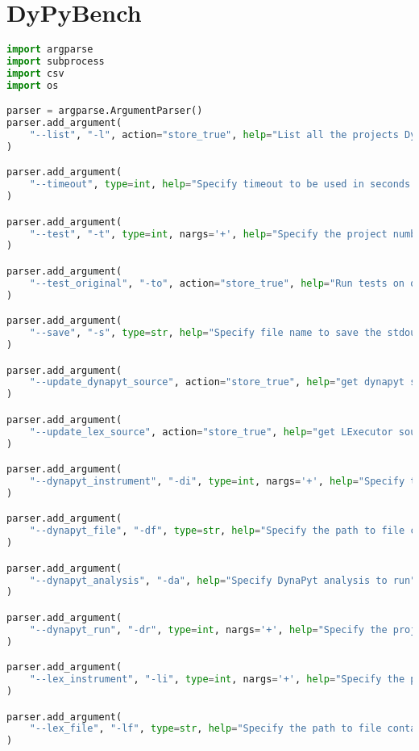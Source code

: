 \section{DyPyBench}
\lstset{numbers=left, numberstyle=\tiny, stepnumber=1, numbersep=5pt, columns=flexible, breaklines=true, numberblanklines=false}
\lstset{basicstyle=\ttfamily}
\lstset{frame=tb}
\begin{lstlisting}[caption=Access Interface of DyPyBench,label=code:dypybench.py,language=Python]
import argparse
import subprocess
import csv
import os

parser = argparse.ArgumentParser()
parser.add_argument(
    "--list", "-l", action="store_true", help="List all the projects DyPyBench supports"
)

parser.add_argument(
    "--timeout", type=int, help="Specify timeout to be used in seconds for execution of subprocesses", default=(60*10)
)

parser.add_argument(
    "--test", "-t", type=int, nargs='+', help="Specify the project number to run the test suite"
)

parser.add_argument(
    "--test_original", "-to", action="store_true", help="Run tests on original code"
)

parser.add_argument(
    "--save", "-s", type=str, help="Specify file name to save the stdout and stderr combined"
)

parser.add_argument(
    "--update_dynapyt_source", action="store_true", help="get dynapyt source code"
)

parser.add_argument(
    "--update_lex_source", action="store_true", help="get LExecutor source code"
)

parser.add_argument(
    "--dynapyt_instrument", "-di", type=int, nargs='+', help="Specify the project no. to run DynaPyt instrumentation"
)

parser.add_argument(
    "--dynapyt_file", "-df", type=str, help="Specify the path to file containing the includes.txt file to run the instrumentation"
)

parser.add_argument(
    "--dynapyt_analysis", "-da", help="Specify DynaPyt analysis to run"
)

parser.add_argument(
    "--dynapyt_run", "-dr", type=int, nargs='+', help="Specify the project no. to run DynaPyt Analysis"
)

parser.add_argument(
    "--lex_instrument", "-li", type=int, nargs='+', help="Specify the project no. to run LExecutor instrumentation"
)

parser.add_argument(
    "--lex_file", "-lf", type=str, help="Specify the path to file containing the includes.txt file to run the instrumentation"
)


\end{lstlisting}
